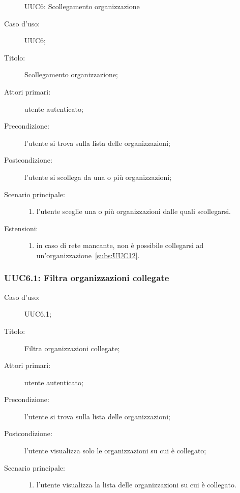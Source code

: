 \documentclass[../../../analisi-dei-requisiti.tex]{subfiles}
\begin{document}
\begin{figure}[H]
  \centering
  \caption{UUC6: Scollegamento organizzazione}%
  \label{fig:UUC12}
\end{figure}

\begin{description}
  \item[Caso d’uso:] UUC6;
  \item[Titolo:] Scollegamento organizzazione;
  \item[Attori primari:] utente autenticato;
  \item[Precondizione:] l'utente si trova sulla lista delle organizzazioni;
  \item[Postcondizione:] l'utente si scollega da una o più organizzazioni;
  \item[Scenario principale:]
        \begin{enumerate}
          \item l'utente sceglie una o più organizzazioni dalle quali scollegarsi.
        \end{enumerate}
  \item[Estensioni:]
        \begin{enumerate}
          \item in caso di rete mancante, non è possibile collegarsi ad un'organizzazione~\ref{subs:UUC12}.
        \end{enumerate}
\end{description}


\subsubsection{UUC6.1: Filtra organizzazioni collegate}%
\begin{description}
  \item[Caso d’uso:] UUC6.1;
  \item[Titolo:] Filtra organizzazioni collegate;
  \item[Attori primari:] utente autenticato;
  \item[Precondizione:] l'utente si trova sulla lista delle organizzazioni;
  \item[Postcondizione:] l'utente visualizza solo le organizzazioni su cui è collegato;
  \item[Scenario principale:]
        \begin{enumerate}
          \item l'utente visualizza la lista delle organizzazioni su cui è collegato.
        \end{enumerate}
\end{description}
\end{document}
